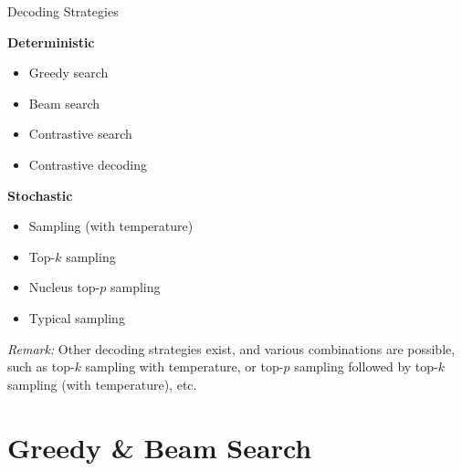 
\begin{frame}{Decoding Strategies}

\textbf{Deterministic}
\begin{itemize}
    \item Greedy search
    \item Beam search
    \item Contrastive search 
    \item Contrastive decoding 
\end{itemize}

\textbf{Stochastic}
\begin{itemize}
    \item Sampling (with temperature) 
    \item Top-$k$ sampling 
    \item Nucleus top-$p$ sampling 
    \item Typical sampling 
\end{itemize}
\vspace{1ex}

\textit{Remark:} Other decoding strategies exist, and various combinations are possible, such as top-$k$ sampling with temperature, or top-$p$ sampling followed by top-$k$ sampling (with temperature), etc.

\end{frame}



\section{Greedy \& Beam Search}

